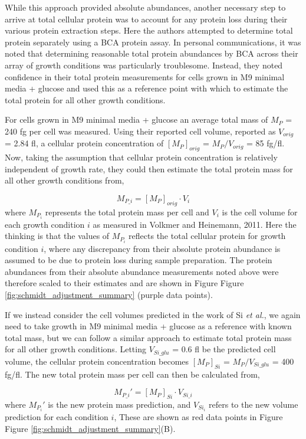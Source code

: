 While this approach provided absolute abundances, another necessary step
to arrive at total cellular protein was to account for any protein loss during
their various protein extraction steps. Here the authors attempted to determine
total protein separately using a BCA protein assay.  In personal communications,
it was noted that determining reasonable total protein abundances by BCA across
their array of growth conditions  was particularly troublesome. Instead, they
noted confidence in their total protein measurements for cells grown in M9
minimal media + glucose and  used this as a reference point with which to
estimate the total protein for all other growth conditions.

For cells grown in M9 minimal media + glucose an average total mass of $M_P$ =
240 fg per cell was measured. Using their reported cell volume, reported as
$V_{orig}$ = 2.84 fl, a cellular protein concentration of $[M_P]_{orig}$ =
$M_P/V_{orig}$ = 85 fg/fl. Now, taking the assumption that cellular protein
concentration is relatively independent of growth rate, they could then estimate
the total protein mass for all other growth conditions from,

\begin{equation}
	M_{P\_i} = [M_P]_{orig} \cdot V_{i}
\end{equation}
where $M_{P_i}$ represents the total protein mass per cell and $V_{i}$ is the
cell volume for each growth condition $i$ as measured in Volkmer and Heinemann,
2011. Here the thinking is that the values of $M_{P_i}$ reflects the total
cellular protein for growth condition $i$, where any discrepancy from their
absolute protein abundance is assumed to be due to protein loss during sample
preparation. The protein abundances from their absolute abundance measurements
noted above were therefore scaled to their estimates and are  shown in Figure
Figure \ref{fig:schmidt_adjustment_summary} (purple data points).

If we instead consider the cell volumes predicted in the work of Si \textit{et
al.}, we again need to take growth in M9 minimal media + glucose as a reference
with known total mass, but we can follow a similar approach to estimate total
protein mass for all other growth conditions. Letting  $V_{Si\_glu}$ = 0.6 fl be
the predicted cell volume, the cellular protein concentration becomes
$[M_P]_{Si}$ = $M_P/V_{Si\_glu}$ = 400 fg/fl. The new total protein mass per
cell can then be calculated from,

\begin{equation}
	M_{P\_i}' = [M_P]_{Si} \cdot V_{Si\_i}
\end{equation}
where $M_{P_i}'$ is the new protein mass prediction, and $V_{Si_i}$ refers to
the new volume prediction for each condition $i$, These are shown as red data points in
Figure Figure \ref{fig:schmidt_adjustment_summary}(B).


